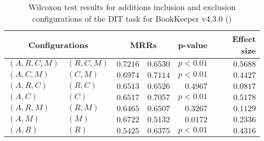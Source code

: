 
\begin{table}
\begin{spacing}{1.2}
\centering
\caption{Wilcoxon test results for additions inclusion and exclusion configurations of the DIT task for BookKeeper v4.3.0 (\ctwo)}
\label{table:versus-wilcox-bookkeeper-dit-additions}
\begin{tabular}{ll|rr|rr}
\toprule
      \multicolumn{2}{c|}{Configurations} &                \multicolumn{2}{c|}{MRRs} &             p-value & Effect size \\
\midrule
 $(A,R,C,M)$ &  $(R,C,M)$ &  $\bm{0.7216}$ &       $0.6530$ & $p<0.01$ &    $0.5688$ \\
   $(A,C,M)$ &    $(C,M)$ &       $0.6974$ &  $\bm{0.7114}$ & $p<0.01$ &    $0.4427$ \\
   $(A,R,C)$ &    $(R,C)$ &       $0.6513$ &  $\bm{0.6526}$ & $0.4967$ &    $0.0817$ \\
     $(A,C)$ &      $(C)$ &       $0.6517$ &  $\bm{0.7057}$ & $p<0.01$ &    $0.5178$ \\
   $(A,R,M)$ &    $(R,M)$ &       $0.6465$ &  $\bm{0.6507}$ & $0.3267$ &    $0.1129$ \\
     $(A,M)$ &      $(M)$ &  $\bm{0.6722}$ &       $0.5132$ & $0.0172$ &    $0.2336$ \\
     $(A,R)$ &      $(R)$ &       $0.5425$ &  $\bm{0.6375}$ & $p<0.01$ &    $0.4316$ \\
\bottomrule
\end{tabular}

\end{spacing}
\end{table}

